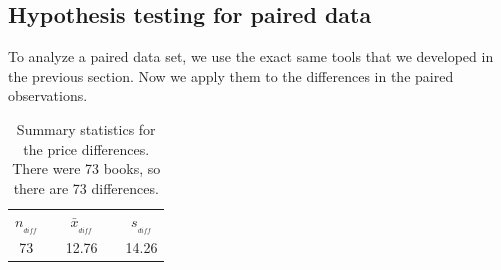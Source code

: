 \subsection{Hypothesis testing for paired data}

To analyze a paired data set, we use the exact same tools that we developed in the previous section. Now we apply them to the differences in the paired observations.

\begin{table}[hh]
\centering
\begin{tabular}{ccccc}
\hline
$n_{_{diff}}$	&\hspace{3mm}& $\bar{x}_{_{diff}}$	&\hspace{3mm}& $s_{_{diff}}$ \vspace{1mm}\\
73			&& 12.76				&& 14.26 \\
\hline
\end{tabular}
\caption{Summary statistics for the price differences. There were 73 books, so there are 73 differences.}
\label{textbooksSummaryStats}
\end{table}

